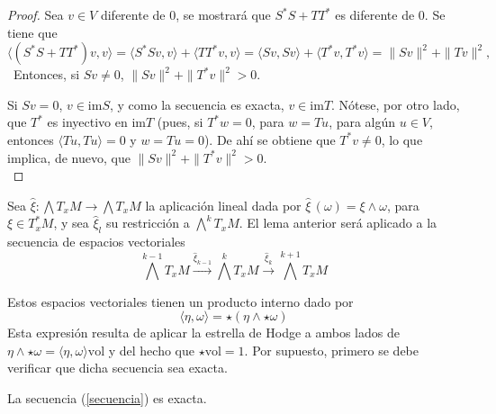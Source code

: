 \begin{proof}
Sea $v\in V$ diferente de 0, se mostrará que $S^{*}S+TT^{*}$ es diferente de 0. Se tiene que \[\langle (S^{*}S+TT^{*})v,v\rangle = \langle S^{*}Sv, v\rangle + \langle TT^{*}v, v\rangle = \langle Sv, Sv\rangle + \langle T^{*}v, T^{*}v\rangle = \|Sv\|^2+\|Tv\|^2,\]\
Entonces, si $Sv \neq 0$, $\|Sv\|^2+\|T^{*}v\|^2 > 0$.

Si $Sv = 0$, $v\in \text{im} S$, y como la secuencia es exacta, $v\in \text{im}T$. Nótese, por otro lado, que $T^{*}$ es inyectivo en $\text{im}T$ (pues, si $T^{*}w = 0$, para $w = Tu$, para algún $u\in V$, entonces $\langle Tu,Tu \rangle = 0$ y $w = Tu = 0$). De ahí se obtiene que $T^{*}v \neq 0$, lo que implica, de nuevo, que $\|Sv\|^2+\|T^{*}v\|^2 > 0$.\\
\end{proof}

Sea $\hat\xi\colon\bigwedge T_xM \to
\bigwedge T_xM$ la aplicación lineal dada por $\hat\xi\, (\omega) = \xi \wedge \omega$, para $\xi\in T^{*}_xM$, y sea $\hat\xi_l$ su restricción a ${\bigwedge^k T_xM}$. El lema anterior será aplicado a la secuencia de espacios vectoriales
\begin{equation}
\label{secuencia}
\bigwedge^{k-1}T_xM \xrightarrow{\hat\xi_{k-1}}
\bigwedge^{k}T_xM \xrightarrow{\hat\xi_k}\bigwedge^{k+1}T_xM
\end{equation}

Estos espacios vectoriales tienen un producto interno dado por \[ \langle \eta,\omega\rangle = \star(\eta \wedge \star\omega)\]
Esta expresión resulta de aplicar la estrella de Hodge a ambos lados de 
$\eta \wedge \star\omega = \langle \eta,\omega\rangle \text{vol} $ y del hecho que $\star \text{vol} = 1$.
Por supuesto, primero se debe verificar que dicha secuencia sea exacta.

\begin{lem}
La secuencia (\ref{secuencia}) es exacta.
\end{lem}

